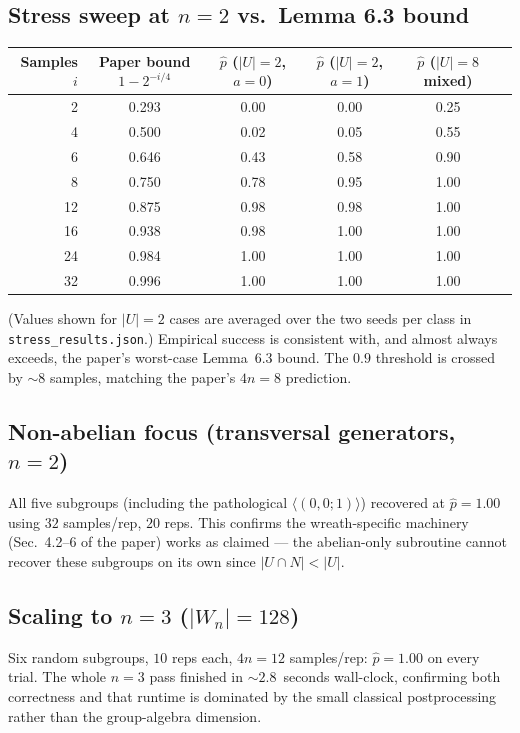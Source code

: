 \documentclass[11pt]{article}
\begin{document}
\subsection{Stress sweep at $n=2$ vs.\ Lemma 6.3 bound}
\begin{center}
\begin{tabular}{rccccc}
\toprule
Samples $i$ & Paper bound $1-2^{-i/4}$ & $\hat p$ ($|U|{=}2$, $a{=}0$) & $\hat p$ ($|U|{=}2$, $a{=}1$) & $\hat p$ ($|U|{=}8$ mixed) \\
\midrule
2 & 0.293 & 0.00 & 0.00 & 0.25 \\
4 & 0.500 & 0.02 & 0.05 & 0.55 \\
6 & 0.646 & 0.43 & 0.58 & 0.90 \\
8 & 0.750 & 0.78 & 0.95 & 1.00 \\
12 & 0.875 & 0.98 & 0.98 & 1.00 \\
16 & 0.938 & 0.98 & 1.00 & 1.00 \\
24 & 0.984 & 1.00 & 1.00 & 1.00 \\
32 & 0.996 & 1.00 & 1.00 & 1.00 \\
\bottomrule
\end{tabular}
\end{center}
(Values shown for $|U|=2$ cases are averaged over the two seeds per class in
\texttt{stress\_results.json}.)  Empirical success is consistent with, and
almost always exceeds, the paper's worst-case Lemma~6.3 bound. The $0.9$
threshold is crossed by $\sim 8$ samples, matching the paper's $4n=8$
prediction.

\subsection{Non-abelian focus (transversal generators, $n=2$)}
All five subgroups (including the pathological
$\langle (0,0;1) \rangle$) recovered at $\hat p = 1.00$ using $32$
samples/rep, $20$ reps. This confirms the wreath-specific machinery
(Sec.\ 4.2--6 of the paper) works as claimed --- the abelian-only
subroutine cannot recover these subgroups on its own since
$|U \cap N| < |U|$.

\subsection{Scaling to $n=3$ ($|W_n| = 128$)}
Six random subgroups, $10$ reps each, $4n=12$ samples/rep:
$\hat p = 1.00$ on every trial. The whole $n=3$ pass finished in
$\sim\!\!2.8$~seconds wall-clock, confirming both correctness and that
runtime is dominated by the small classical postprocessing rather than
the group-algebra dimension.
\end{document}
